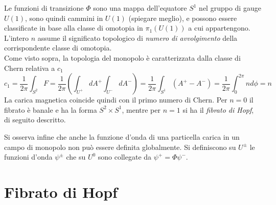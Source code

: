 Le funzioni di transizione $\Phi$ sono una mappa dell'equatore $S^1$ nel gruppo
di gauge $U(1)$, sono quindi cammini in $U(1)$ (spiegare meglio), e possono essere
classificate in base alla classe di omotopia in $\pi_1(U(1))$ a cui appartengono.
L'intero $n$ assume il significato topologico di \emph{numero di avvolgimento}
della corrispondente classe di omotopia.\\

Come visto sopra, la topologia del monopolo è caratterizzata dalla classe di Chern
relativa a $c_1$
\begin{equation*}
      c_1   = \frac{1}{2\pi} \int_{S^2} F
            = \frac{1}{2\pi} \left( \int_{U^+} dA^+ \int_{U^-} dA^- \right)
            = \frac{1}{2\pi} \int_{S^1} (A^+-A^-)
            = \frac{1}{2\pi} \int_0^{2\pi} nd\phi  = n
\end{equation*}
La carica magnetica coincide quindi con il primo numero di Chern. Per $n=0$ il
fibrato è banale e ha la forma $S^2 \times S^1$, mentre per $n=1$ si ha il
\emph{fibrato di Hopf}, di seguito descritto.

Si osserva infine che anche la funzione d'onda di una particella carica in un
campo di monopolo non può essere definita globalmente.
Si definiscono su $U^\pm$ le funzioni d'onda $\psi^\pm$ che su $U^0$ sono collegate
da $\psi^+ = \Phi \psi^-$.
\section{Fibrato di Hopf}
